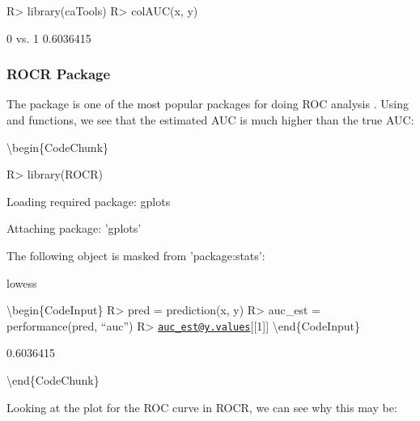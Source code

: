 \documentclass[article]{jss}
\begin{document}
\begin{CodeChunk}

\begin{CodeInput}
R> library(caTools)
R> colAUC(x, y)
\end{CodeInput}

\begin{CodeOutput}
             [,1]
0 vs. 1 0.6036415
\end{CodeOutput}
\end{CodeChunk}

\hypertarget{rocr-package}{%
\subsubsection{ROCR Package}\label{rocr-package}}

The  package is one of the most popular packages for doing ROC
analysis \citep{ROCR}. Using  and 
functions, we see that the estimated AUC is much higher than the true
AUC:

\textbackslash{}begin\{CodeChunk\}

\begin{CodeInput}
R> library(ROCR)
\end{CodeInput}

\begin{CodeOutput}
Loading required package: gplots
\end{CodeOutput}

\begin{CodeOutput}

Attaching package: 'gplots'
\end{CodeOutput}

\begin{CodeOutput}
The following object is masked from 'package:stats':

    lowess
\end{CodeOutput}

\textbackslash{}begin\{CodeInput\} R\textgreater{} pred = prediction(x,
y) R\textgreater{} auc\_est = performance(pred, ``auc'') R\textgreater{}
\href{mailto:auc_est@y.values}{\nolinkurl{auc\_est@y.values}}{[}{[}1{]}{]}
\textbackslash{}end\{CodeInput\}

\begin{CodeOutput}
[1] 0.6036415
\end{CodeOutput}

\textbackslash{}end\{CodeChunk\}

Looking at the plot for the ROC curve in ROCR, we can see why this may
be:
\end{document}
